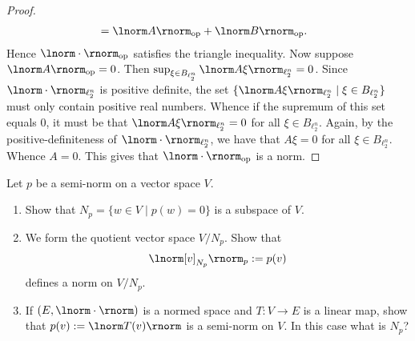 \documentclass[11pt,twoside,openany]{memoir}
\begin{document}
\begin{proof}
\begin{equation*}
\begin{split}
                    & = \lnorm A \rnorm_\text{op} + \lnorm B \rnorm_\text{op}. 
                \end{split}
                \end{equation*}
            Hence $\lnorm \cdot \rnorm_\text{op}$ satisfies the triangle inequality. Now suppose $\lnorm A \rnorm_\text{op} = 0$. Then $\sup_{\xi \in B_{\ell_2^n}}\lnorm A\xi \rnorm_{\ell_2^n} = 0$. Since $\lnorm \cdot \rnorm_{\ell_2^n}$ is positive definite, the set $\{\lnorm A\xi \rnorm_{\ell_2^n} \mid \xi \in B_{\ell_2^n}\}$ must only contain positive real numbers. Whence if the supremum of this set equals $0$, it must be that $\lnorm A \xi \rnorm_{\ell_2^n} = 0$ for all $\xi \in B_{\ell_2^n}$. Again, by the positive-definiteness of $\lnorm \cdot \rnorm_{\ell_2^n}$, we have that $A\xi = 0$ for all $\xi \in B_{\ell_2^n}$. Whence $A = 0$. This gives that $\lnorm \cdot \rnorm_\text{op}$ is a norm.
        \end{proof}
    \newpage
    \addtocounter{exercise}{2}
    \begin{exercise}
        Let $p$ be a semi-norm on a vector space $V$.
        \begin{enumerate}[label = (\arabic*),itemsep=1pt,topsep=3pt]
            \item Show that $N_p = \{w \in V \mid p(w) = 0\}$ is a subspace of $V$.
            \item We form the quotient vector space $V/N_p$. Show that
                \begin{equation*}
                \begin{split}
                    \lnorm [v]_{N_p} \rnorm_p := p(v)
                \end{split}
                \end{equation*}
                defines a norm on $V/N_p$.
            \item If $(E,\lnorm \cdot \rnorm)$ is a normed space and $T:V \rightarrow E$ is a linear map, show that $p(v) := \lnorm T(v) \rnorm$ is a semi-norm on $V$. In this case what is $N_p$?
        \end{enumerate}
    \end{exercise}
\end{document}
